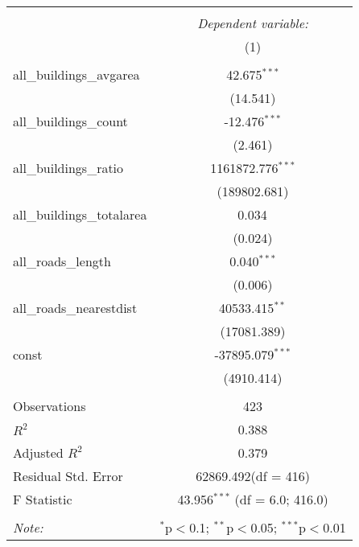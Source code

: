 \begin{table}[!htbp] \centering
\begin{tabular}{@{\extracolsep{5pt}}lc}
\\[-1.8ex]\hline
\hline \\[-1.8ex]
& \multicolumn{1}{c}{\textit{Dependent variable:}} \
\cr \cline{1-2}
\\[-1.8ex] & (1) \\
\hline \\[-1.8ex]
 all_buildings_avgarea & 42.675$^{***}$ \\
  & (14.541) \\
 all_buildings_count & -12.476$^{***}$ \\
  & (2.461) \\
 all_buildings_ratio & 1161872.776$^{***}$ \\
  & (189802.681) \\
 all_buildings_totalarea & 0.034$^{}$ \\
  & (0.024) \\
 all_roads_length & 0.040$^{***}$ \\
  & (0.006) \\
 all_roads_nearestdist & 40533.415$^{**}$ \\
  & (17081.389) \\
 const & -37895.079$^{***}$ \\
  & (4910.414) \\
\hline \\[-1.8ex]
 Observations & 423 \\
 $R^2$ & 0.388 \\
 Adjusted $R^2$ & 0.379 \\
 Residual Std. Error & 62869.492(df = 416)  \\
 F Statistic & 43.956$^{***}$ (df = 6.0; 416.0) \\
\hline
\hline \\[-1.8ex]
\textit{Note:} & \multicolumn{1}{r}{$^{*}$p$<$0.1; $^{**}$p$<$0.05; $^{***}$p$<$0.01} \\
\end{tabular}
\end{table}